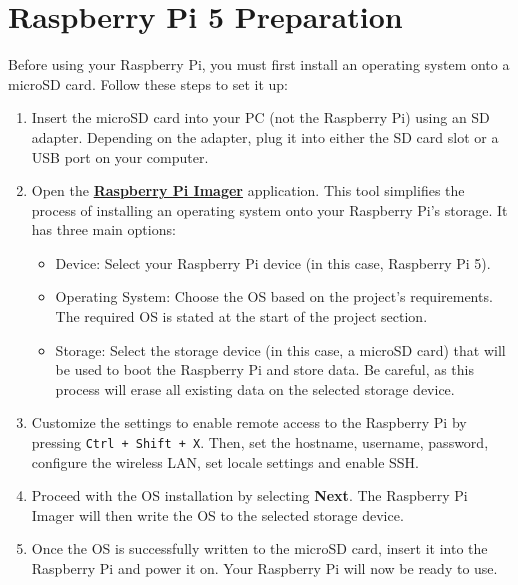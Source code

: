 \section*{ Raspberry Pi 5 Preparation}

Before using your Raspberry Pi, you must first install an operating system onto a microSD card. Follow these steps to set it up:
\begin{enumerate}
\item Insert the microSD card into your PC (not the Raspberry Pi) using an SD adapter. Depending on the adapter, plug it into either the SD card slot or a USB port on your computer.
\item Open the \href{https://www.raspberrypi.com/software}{\textbf{\color{blue}Raspberry Pi Imager}} application. This tool simplifies the process of installing an operating system onto your Raspberry Pi’s storage. It has three main options:
\begin{itemize}
\item Device: Select your Raspberry Pi device (in this case, Raspberry Pi 5).
\item Operating System: Choose the OS based on the project’s requirements. The required OS is stated at the start of the project section.
\item Storage: Select the storage device (in this case, a microSD card) that will be used to boot the Raspberry Pi and store data. Be careful, as this process will erase all existing data on the selected storage device.
\end{itemize}
\item Customize the settings to enable remote access to the Raspberry Pi by pressing \texttt{Ctrl + Shift + X}. Then, set the hostname, username, password, configure the wireless LAN, set locale settings and enable SSH.
\item Proceed with the OS installation by selecting \textbf{Next}. The Raspberry Pi Imager will then write the OS to the selected storage device.
\item Once the OS is successfully written to the microSD card, insert it into the Raspberry Pi and power it on. Your Raspberry Pi will now be ready to use.
\end{enumerate}

